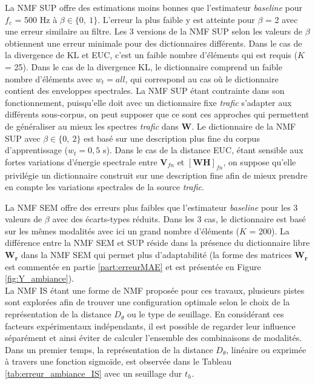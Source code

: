 La NMF SUP offre des estimations moins bonnes que l'estimateur \textit{baseline} pour $f_c$ = 500 Hz à  $\beta \in \lbrace 0,~1 \rbrace$. L'erreur la plus faible y est atteinte pour $\beta$ = 2 avec une erreur similaire au filtre.
Les 3 versions de la NMF SUP selon les valeurs de $\beta$ obtiennent une erreur minimale pour des dictionnaires différents. Dans le cas de la divergence de KL et EUC, c'est un faible nombre d'éléments qui est requis ($K$ = 25). Dans le cas de la divergence KL, le dictionnaire comprend un faible nombre d'éléments avec $w_t = all$, qui correspond au cas où le dictionnaire contient des enveloppes spectrales. La NMF SUP étant contrainte dans son fonctionnement, puisqu'elle doit avec un dictionnaire fixe \textit{trafic} s'adapter aux différents sous-corpus, on peut supposer que ce sont ces approches qui permettent de généraliser au mieux les spectres \textit{trafic} dans $\mathbf{W}$. Le dictionnaire de la NMF SUP avec $\beta \in \lbrace 0,~2 \rbrace$ est basé sur une description plus fine du corpus d'apprentissage ($w_t = 0,5$ s). Dans le cas de la distance EUC, étant sensible aux fortes variations d'énergie spectrale entre $\mathbf{V}_{fn}$ et $\left[\mathbf{WH}\right]_{fn}$, on suppose qu'elle privilégie un dictionnaire construit sur une description fine afin de mieux prendre en compte les variations spectrales de la source \textit{trafic}.

La NMF SEM offre des erreurs plus faibles que l'estimateur \textit{baseline} pour les 3 valeurs de $\beta$ avec des écarts-types réduits. Dans les 3 cas, le dictionnaire est basé sur les mêmes modalités avec ici un grand nombre d'éléments ($K$ = 200).
La différence entre la NMF SEM et SUP réside dans la présence du dictionnaire libre $\mathbf{W_r}$ dans la NMF SEM qui permet plus d'adaptabilité (la forme des matrices $\mathbf{W_r}$ est commentée en partie \ref{part:erreurMAE} et est présentée en Figure \ref{fig:Y_ambiance}).\\

La NMF IS étant une forme de NMF proposée pour ces travaux, plusieurs pistes sont explorées afin de trouver une configuration optimale selon le choix de la représentation de la distance $D_{\theta}$ ou le type de seuillage. En considérant ces facteurs expérimentaux indépendants, il est possible de regarder leur influence séparément et ainsi éviter de calculer l'ensemble des combinaisons de modalités. Dans un premier temps, la représentation de la distance $D_{\theta}$, linéaire ou exprimée à travers une fonction sigmoïde, est observée dans le Tableau \ref{tab:erreur_ambiance_IS} avec un seuillage dur $t_h$.

